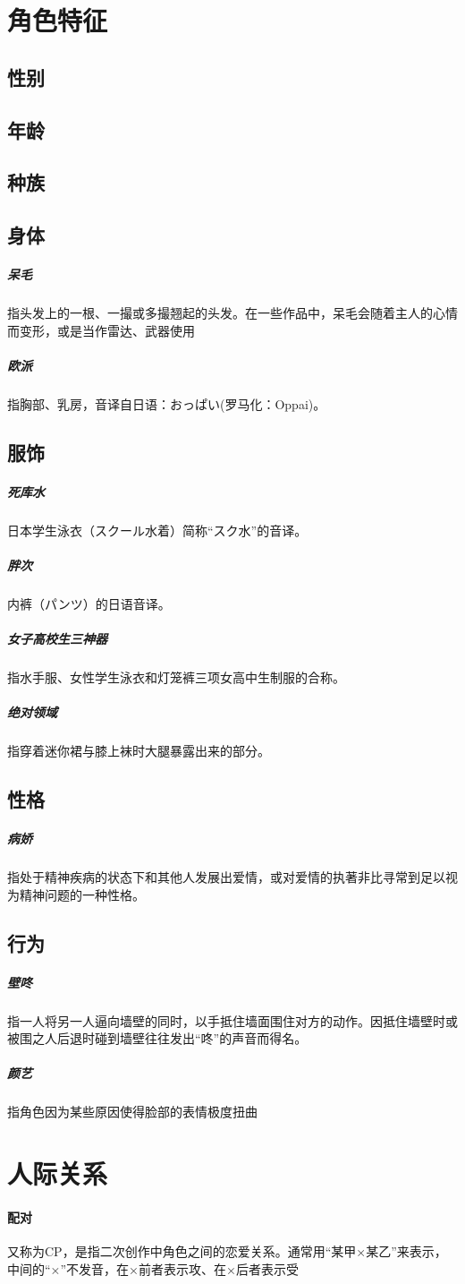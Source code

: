 \documentclass[UTF8,12pt]{ctexart}
\begin{document}
\section{角色特征}
\subsection{性别}
\subsection{年龄}
\subsection{种族}
\subsection{身体}
\subparagraph{呆毛}指头发上的一根、一撮或多撮翘起的头发。在一些作品中，呆毛会随着主人的心情而变形，或是当作雷达、武器使用
\subparagraph{欧派}指胸部、乳房，音译自日语：おっぱい(罗马化：Oppai)。
\subsection{服饰}
\subparagraph{死库水}日本学生泳衣（スクール水着）简称“スク水”的音译。
\subparagraph{胖次}内裤（パンツ）的日语音译。
\subparagraph{女子高校生三神器}指水手服、女性学生泳衣和灯笼裤三项女高中生制服的合称。
\subparagraph{绝对领域}指穿着迷你裙与膝上袜时大腿暴露出来的部分。
\subsection{性格}
\subparagraph{病娇}指处于精神疾病的状态下和其他人发展出爱情，或对爱情的执著非比寻常到足以视为精神问题的一种性格。
\subsection{行为}
\subparagraph{壁咚}指一人将另一人逼向墙壁的同时，以手抵住墙面围住对方的动作。因抵住墙壁时或被围之人后退时碰到墙壁往往发出“咚”的声音而得名。
\subparagraph{颜艺}指角色因为某些原因使得脸部的表情极度扭曲

\section{人际关系}
\paragraph{配对}
又称为CP，是指二次创作中角色之间的恋爱关系。通常用“某甲×某乙”来表示，中间的“×”不发音，在×前者表示攻、在×后者表示受
\end{document}
